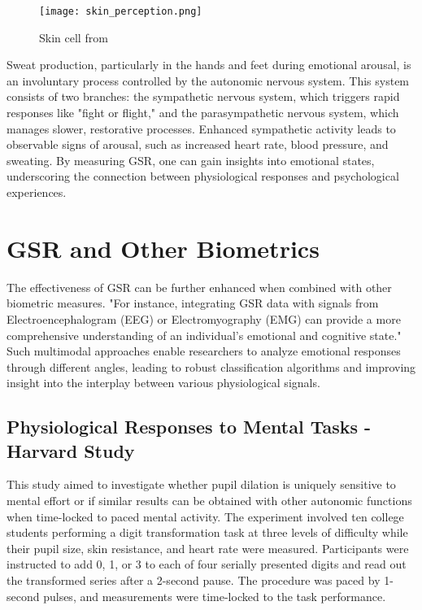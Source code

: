 \documentclass[twocolumn]{article}
\begin{document}
    \begin{figure}[H]
    \centering
    \texttt{[image: skin\_perception.png]}
    \caption{Skin cell from \cite{imotionsGalvanicSkin}}
    \label{fig:NR}
    \end{figure}

Sweat production, particularly in the hands and feet during emotional arousal, is an involuntary process controlled by the autonomic nervous system. This system consists of two branches: the sympathetic nervous system, which triggers rapid responses like "fight or flight," and the parasympathetic nervous system, which manages slower, restorative processes. Enhanced sympathetic activity leads to observable signs of arousal, such as increased heart rate, blood pressure, and sweating. By measuring GSR, one can gain insights into emotional states, underscoring the connection between physiological responses and psychological experiences.\cite{imotionsGalvanicSkin}

\section{GSR and Other Biometrics}

The effectiveness of GSR can be further enhanced when combined with other biometric measures. "For instance, integrating GSR data with signals from Electroencephalogram (EEG) or Electromyography (EMG) can provide a more comprehensive understanding of an individual's emotional and cognitive state."\cite{Wan_Wang_Wang_Tang_Liu_2024} Such multimodal approaches enable researchers to analyze emotional responses through different angles, leading to robust classification algorithms and improving insight into the interplay between various physiological signals.

\subsection{Physiological Responses to Mental Tasks - Harvard Study}

This study aimed to investigate whether pupil dilation is uniquely sensitive to mental effort or if similar results can be obtained with other autonomic functions when time-locked to paced mental activity. The experiment involved ten college students performing a digit transformation task at three levels of difficulty while their pupil size, skin resistance, and heart rate were measured. Participants were instructed to add 0, 1, or 3 to each of four serially presented digits and read out the transformed series after a 2-second pause. The procedure was paced by 1-second pulses, and measurements were time-locked to the task performance.\cite{article}
\end{document}
